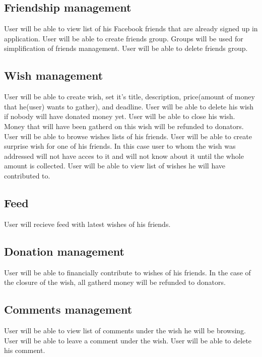 \subsection{Friendship management}
User will be able to view list of his Facebook friends that are already signed up in application.
User will be able to create friends group. Groups will be used for simplification of friends management.
User will be able to delete friends group.

\subsection{Wish management}
User will be able to create wish, set it's title, description, price(amount of money that he(user) wants to gather),
and deadline.
User will be able to delete his wish if nobody will have donated money yet.
User will be able to close his wish. Money that will have been gatherd on this wish will be refunded to donators.
User will be able to browse wishes lists of his friends.
User will be able to create surprise wish for one of his friends. In this case user to whom the wish was addressed
will not have acces to it and will not know about it until the whole amount is collected.
User will be able to view list of wishes he will have contributed to.

\subsection{Feed}
User will recieve feed with latest wishes of his friends.

\subsection{Donation management}
User will be able to financially contribute to wishes of his friends.
In the case of the closure of the wish, all gatherd money will be refunded to donators.

\subsection{Comments management}
User will be able to view list of comments under the wish he will be browsing.
User will be able to leave a comment under the wish.
User will be able to delete his comment.

